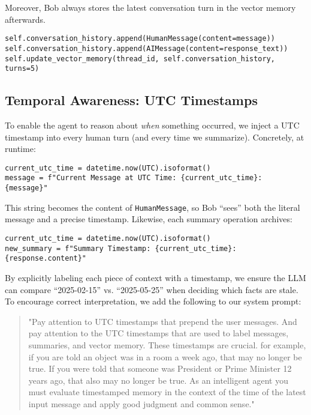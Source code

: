 \documentclass[conference]{IEEEtran}
\begin{document}
Moreover, Bob always stores the latest conversation turn in the vector memory afterwards.

\begin{verbatim}
self.conversation_history.append(HumanMessage(content=message))
self.conversation_history.append(AIMessage(content=response_text))
self.update_vector_memory(thread_id, self.conversation_history, turns=5)
\end{verbatim}

\subsection{Temporal Awareness: UTC Timestamps}
To enable the agent to reason about \emph{when} something occurred, we inject a UTC timestamp into every human turn (and every time we summarize). Concretely, at runtime:
\begin{verbatim}
current_utc_time = datetime.now(UTC).isoformat()
message = f"Current Message at UTC Time: {current_utc_time}: {message}"
\end{verbatim}
This string becomes the content of \texttt{HumanMessage}, so Bob ``sees'' both the 
literal message and a precise timestamp. Likewise, each summary operation archives:
\begin{verbatim}
current_utc_time = datetime.now(UTC).isoformat()
new_summary = f"Summary Timestamp: {current_utc_time}: {response.content}"
\end{verbatim}
By explicitly labeling each piece of context with a timestamp, 
we ensure the LLM can compare ``2025-02-15'' vs. ``2025-05-25'' 
when deciding which facts are stale. To encourage correct interpretation, 
we add the following to our system prompt:
\begin{quote}
  "Pay attention to UTC timestamps that prepend the user messages.  And pay attention to the UTC timestamps that are used to label messages, summaries, and vector memory.  These timestamps are crucial.  for example, if you are told an object was in a room a week ago, that may no longer be true.  If you were told that someone was President or Prime Minister 12 years ago, that also may no longer be true.  As an intelligent agent you must evaluate timestamped memory in the context of the time of the latest input message and apply good judgment and common sense."
\end{quote}
\end{document}
